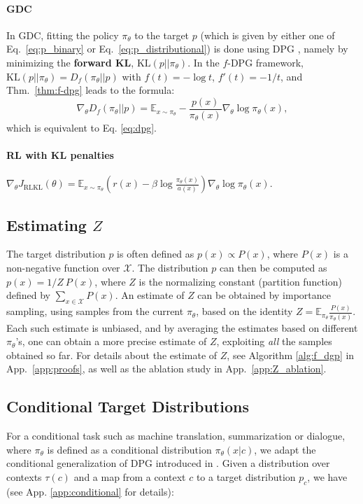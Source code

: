 \paragraph{GDC} In GDC, fitting the policy ${\pi_\theta}$ to the target $p$ {(which is given by either one of Eq.~\ref{eq:p_binary} or Eq.~\ref{eq:p_distributional}}) is done using DPG \cite{parshakova2019distributional}, namely {by} minimizing the \textbf{forward KL}, $\text{KL}(p||{\pi_\theta})$. In the $f$-DPG framework, $\text{KL}(p||{\pi_\theta}) = D_f({\pi_\theta}||p)$ with $f(t)=-\log t$, $f'(t) = -1/t$, and Thm.~\ref{thm:f-dpg} leads to the formula:
\[
{\nabla_{\theta}} D_f({\pi_\theta}||p) = \mathbb{E}_{x\sim{\pi_\theta}}-\frac{p(x)}{{\pi_\theta}(x)}\nabla_{\theta}\log{\pi_\theta}(x),
\]
which is equivalent to Eq. \ref{eq:dpg}.

\paragraph{RL with KL penalties}

$
    {\nabla_{\theta}} J_{\mathrm{RLKL}}(\theta) = \mathbb{E}_{x\sim{\pi_\theta}}\left(r(x)-\beta\log\frac{{\pi_\theta}(x)}{a(x)}\right){\nabla_{\theta}}\log{\pi_\theta}(x).
$

\subsection{Estimating $Z$} The target distribution $p$ is often defined as $p(x) \propto P(x)$, where $P(x)$ is a non-negative function over $\mathcal{X}$. 
The distribution $p$ can then be computed as $p(x) = 1/Z\ P(x)$, where $Z$ is the normalizing constant (partition function) defined by $\sum_{x\in \mathcal{X}} P(x)$. An estimate of $Z$ can be obtained by importance sampling, using samples from the current ${\pi_\theta}$, based on the identity $Z = \mathbb{E}_{\pi_\theta} \frac{P(x)}{{\pi_\theta}(x)}$. Each such estimate is unbiased, and by averaging the estimates based on different ${\pi_\theta}$'s, one can obtain a more precise estimate of $Z$, exploiting \emph{all} the samples obtained so far. For details about the estimate of $Z$, see Algorithm \ref{alg:f_dgp} in App.~\ref{app:proofs}, as well as the ablation study in App.~\ref{app:Z_ablation}. 

\subsection{Conditional Target Distributions} For a conditional task such as machine translation, summarization or dialogue, {where ${\pi_\theta}$ is defined as a conditional distribution ${\pi_\theta}(x|c)$, } {we adapt the conditional generalization of DPG} introduced in \citet{korbak2021controlling}. Given a distribution over contexts $\tau(c)$ {and a map from a context $c$ to a target distribution $p_c$}, we have ({see App. \ref{app:conditional} for details}):

